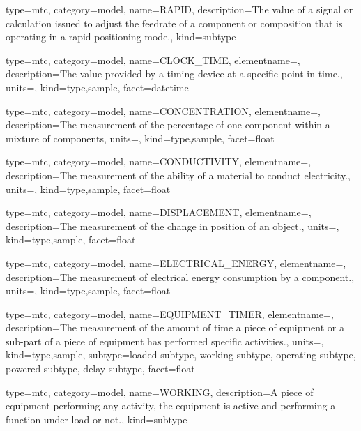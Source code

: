 {
  type=mtc,
  category=model,
  name={RAPID},
  description={The value of a signal or calculation issued to adjust the feedrate of a component or composition that is operating in a rapid positioning mode.},
  kind={subtype}
}


{
  type=mtc,
  category=model,
  name={CLOCK\_TIME},
  elementname=,
  description={The value provided by a timing device at a specific point in time.},
  units=,
  kind={type,sample},
  facet={\gls{datetime}}
}


{
  type=mtc,
  category=model,
  name={CONCENTRATION},
  elementname=,
  description={The measurement of the percentage of one component within a mixture of components},
  units=,
  kind={type,sample},
  facet={\gls{float}}
}


{
  type=mtc,
  category=model,
  name={CONDUCTIVITY},
  elementname=,
  description={The measurement of the ability of a material to conduct electricity.},
  units=,
  kind={type,sample},
  facet={\gls{float}}
}


{
  type=mtc,
  category=model,
  name={DISPLACEMENT},
  elementname=,
  description={The measurement of the change in position of an object.},
  units=,
  kind={type,sample},
  facet={\gls{float}}
}


{
  type=mtc,
  category=model,
  name={ELECTRICAL\_ENERGY},
  elementname=,
  description={The measurement of electrical energy consumption by a component.},
  units=,
  kind={type,sample},
  facet={\gls{float}}
}


{
  type=mtc,
  category=model,
  name={EQUIPMENT\_TIMER},
  elementname=,
  description={The measurement of the amount of time a piece of equipment or a sub-part of a piece of equipment has performed specific activities.},
  units=,
  kind={type,sample},
  subtype={\gls{loaded subtype}, \gls{working subtype}, \gls{operating subtype}, \gls{powered subtype}, \gls{delay subtype}},
  facet={\gls{float}}
}



{
  type=mtc,
  category=model,
  name={WORKING},
  description={A piece of equipment performing any activity, the equipment is active and performing a function under load or not.},
  kind={subtype}
}


